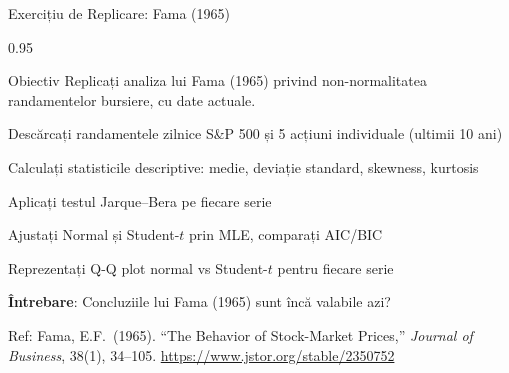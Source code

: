\documentclass[9pt, aspectratio=169, t]{beamer}
\begin{document}
\begin{frame}{Exercițiu de Replicare: Fama (1965)}
    \begin{cminipage}{0.95\textwidth}
        \begin{block}{Obiectiv}
            Replicați analiza lui Fama (1965) privind non-normalitatea randamentelor bursiere, cu date actuale.
        \end{block}
        \begin{enumerate}\setlength{\itemsep}{2pt}
            {\small
            \item Descărcați randamentele zilnice S\&P 500 și 5 acțiuni individuale (ultimii 10 ani)
            \item Calculați statisticile descriptive: medie, deviație standard, skewness, kurtosis
            \item Aplicați testul Jarque--Bera pe fiecare serie
            \item Ajustați Normal și Student-$t$ prin MLE, comparați AIC/BIC
            \item Reprezentați Q-Q plot normal vs Student-$t$ pentru fiecare serie
            \item \textbf{Întrebare}: Concluziile lui Fama (1965) sunt încă valabile azi?
            }
        \end{enumerate}
        {\tiny Ref: Fama, E.F.\ (1965). ``The Behavior of Stock-Market Prices,'' \textit{Journal of Business}, 38(1), 34--105. \url{https://www.jstor.org/stable/2350752}}
    \end{cminipage}
\end{frame}
\end{document}
